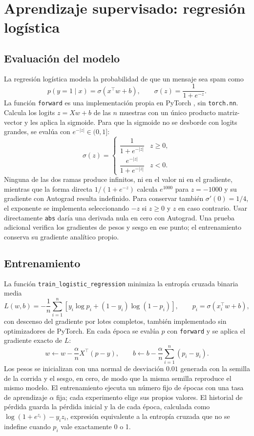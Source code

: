 \section{Aprendizaje supervisado: regresión logística}
\label{sec:punto1}


\subsection{Evaluación del modelo}

La regresión logística modela la probabilidad de que un mensaje sea spam como
\[
    p(y=1\mid x) = \sigma(x^\top w + b), \qquad \sigma(z) = \frac{1}{1+e^{-z}}.
\]
La función \texttt{forward} es una implementación propia en PyTorch
\cite{paszke2019pytorch}, sin \texttt{torch.nn}. Calcula los logits
$z = Xw + b$ de las $n$ muestras con un único producto matriz-vector y les
aplica la sigmoide. Para que la sigmoide no se desborde con logits grandes,
se evalúa con $e^{-|z|}\in(0,1]$:
\[
    \sigma(z) =
    \begin{cases}
        \dfrac{1}{1+e^{-|z|}} & z \geq 0,\\[2ex]
        \dfrac{e^{-|z|}}{1+e^{-|z|}} & z < 0.
    \end{cases}
\]
Ninguna de las dos ramas produce infinitos, ni en el valor ni en el
gradiente, mientras que la forma directa $1/(1+e^{-z})$ calcula $e^{1000}$
para $z=-1000$ y su gradiente con Autograd resulta indefinido.
Para conservar también $\sigma'(0)=1/4$, el exponente se implementa
seleccionando $-z$ si $z\geq0$ y $z$ en caso contrario. Usar directamente
\texttt{abs} daría una derivada nula en cero con Autograd. Una prueba
adicional verifica los gradientes de pesos y sesgo en ese punto; el
entrenamiento conserva su gradiente analítico propio.

\subsection{Entrenamiento}

La función \texttt{train\_logistic\_regression} minimiza la entropía cruzada
binaria media
\[
    L(w,b) = -\frac{1}{n}\sum_{i=1}^{n}
    \left[y_i\log p_i + (1-y_i)\log(1-p_i)\right],
    \qquad p_i = \sigma(x_i^\top w + b),
\]
con descenso del gradiente por lotes completos, también implementado sin
optimizadores de PyTorch. En cada época se evalúa $p$ con \texttt{forward} y
se aplica el gradiente exacto de $L$:
\[
    w \leftarrow w - \frac{\alpha}{n} X^\top (p - y), \qquad
    b \leftarrow b - \frac{\alpha}{n} \sum_{i=1}^{n} (p_i - y_i).
\]
Los pesos se inicializan con una normal de desviación $0.01$ generada con la
semilla de la corrida y el sesgo, en cero, de modo que la misma semilla
reproduce el mismo modelo. El entrenamiento ejecuta un número fijo de épocas
con una tasa de aprendizaje $\alpha$ fija; cada experimento elige sus propios
valores. El historial de pérdida
guarda la pérdida inicial y la de cada época, calculada como
$\log(1+e^{z_i}) - y_i z_i$, expresión equivalente a la entropía cruzada que
no se indefine cuando $p_i$ vale exactamente 0 o 1.

